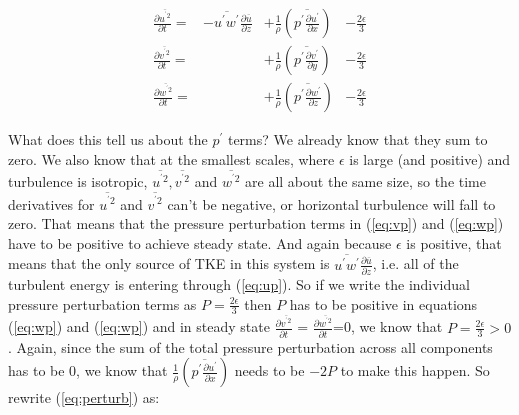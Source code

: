 \documentclass[12pt]{article}
\begin{document}
\begin{subequations}
\label{eq:perturb}
\begin{align}
  \frac{\partial  \overline{ u^{^\prime 2}}}{\partial t} = & 
- \overline{ u^\prime w^\prime  } \frac{\partial  \overline{u } }{\partial  z} &
+ \frac{ 1}{\rho} \left (    \overline{ p^\prime \frac{ \partial u^\prime }{\partial x}  }  \right ) & - \frac{2 \epsilon }{3} \label{eq:up}\\
  \frac{\partial  \overline{ v^{^\prime 2}}}{\partial t} = & \text{ }
  &
+ \frac{ 1}{\rho} \left (   \overline{ p^\prime \frac{ \partial v^\prime }{\partial y}  }  \right ) & - \frac{2 \epsilon }{3}\label{eq:vp}\\
  \frac{\partial  \overline{ w^{^\prime 2}}}{\partial t} = & \text{ }
  &  
+ \frac{ 1}{\rho} \left (   \overline{ p^\prime \frac{ \partial w^\prime }{\partial z}  }  \right )  & - \frac{2 \epsilon }{3}\label{eq:wp}
\end{align}
\end{subequations}

What does this tell us about the $p^\prime$ terms?  We already know that they sum to zero.  We also know
that at the smallest scales, where $\epsilon$ is large (and positive) and turbulence is
isotropic,
$\overline{ u^{^\prime 2}}, \overline{ v^{^\prime 2}}$ and 
$\overline{ w^{^\prime 2}}$ are all about the
same size, so the time derivatives for $\overline{ u^{^\prime 2}}$ and  
$\overline{ v^{^\prime 2}}$ can't be
negative, or horizontal turbulence will fall to zero.   That means
that the pressure perturbation terms in (\ref{eq:vp}) and (\ref{eq:wp})
have to be positive to achieve steady state.
And again because  $\epsilon$ is positive, that means that the only source
of TKE in this system is $\overline{ u^\prime w^\prime  } \frac{\partial  \overline{u } }{\partial  z}$, i.e. all of the turbulent energy is entering through
(\ref{eq:up}).
So if we 
 write the individual pressure perturbation terms as $P=\frac{2 \epsilon }{3}$ 
then $P$ has to
be positive in equations (\ref{eq:wp}) and (\ref{eq:wp}) and in
steady state 
$  \frac{\partial  \overline{ v^{^\prime 2}}}{\partial t}$ =
$  \frac{\partial  \overline{ w^{^\prime 2}}}{\partial t}$=0, 
we know that $P = \frac{2 \epsilon }{3} > 0$. Again, since 
the sum of the total pressure perturbation across all components
has to be 0, we know that $\frac{ 1}{\rho} \left (    \overline{ p^\prime \frac{ \partial u^\prime }{\partial x}  } \right )$ needs to be $-2P$ to make this
happen.  So  rewrite
(\ref{eq:perturb}) as:
\end{document}
